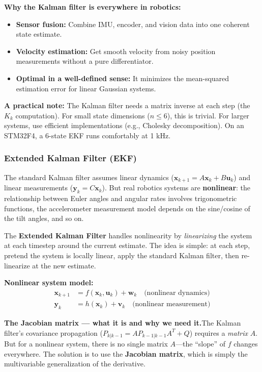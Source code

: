 \textbf{Why the Kalman filter is everywhere in robotics:}
\begin{itemize}
    \item \textbf{Sensor fusion:} Combine IMU, encoder, and vision data into one coherent state estimate.
    \item \textbf{Velocity estimation:} Get smooth velocity from noisy position measurements without a pure differentiator.
    \item \textbf{Optimal in a well-defined sense:} It minimizes the mean-squared estimation error for linear Gaussian systems.
\end{itemize}

\textbf{A practical note:} The Kalman filter needs a matrix inverse at each step (the $K_k$ computation). For small state dimensions ($n \leq 6$), this is trivial. For larger systems, use efficient implementations (e.g., Cholesky decomposition). On an STM32F4, a 6-state EKF runs comfortably at 1 kHz.

\subsubsection{Extended Kalman Filter (EKF)}

The standard Kalman filter assumes linear dynamics ($\mathbf{x}_{k+1} = A\mathbf{x}_k + B\mathbf{u}_k$) and linear measurements ($\mathbf{y}_k = C\mathbf{x}_k$). But real robotics systems are \textbf{nonlinear}: the relationship between Euler angles and angular rates involves trigonometric functions, the accelerometer measurement model depends on the sine/cosine of the tilt angles, and so on.

The \textbf{Extended Kalman Filter} handles nonlinearity by \textit{linearizing} the system at each timestep around the current estimate. The idea is simple: at each step, pretend the system is locally linear, apply the standard Kalman filter, then re-linearize at the new estimate.

\textbf{Nonlinear system model:}
\begin{align}
\mathbf{x}_{k+1} &= f(\mathbf{x}_k, \mathbf{u}_k) + \mathbf{w}_k \quad \text{(nonlinear dynamics)} \\
\mathbf{y}_k &= h(\mathbf{x}_k) + \mathbf{v}_k \quad \text{(nonlinear measurement)}
\end{align}

\textbf{The Jacobian matrix --- what it is and why we need it.}\;The Kalman filter's covariance propagation ($P_{k|k-1} = A P_{k-1|k-1} A^T + Q$) requires a \emph{matrix} $A$. But for a nonlinear system, there is no single matrix $A$---the ``slope'' of $f$ changes everywhere. The solution is to use the \textbf{Jacobian matrix}, which is simply the multivariable generalization of the derivative.

